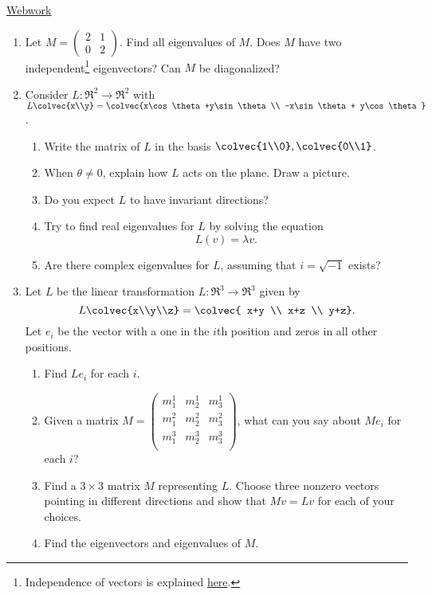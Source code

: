 \href{\webworkurl}{Webwork}


\begin{enumerate}
\item Let $M=\begin{pmatrix}
2 & 1 \\
0 & 2
\end{pmatrix}$.  Find all eigenvalues of $M$.  Does $M$ have two independent\footnote{Independence of vectors is  explained \hyperref[independent]{here}.} eigenvectors?  Can $M$ be diagonalized?


\item Consider $L \colon \Re^2\rightarrow \Re^2$ with $L\colvec{x\\y}
=\colvec{x\cos \theta +y\sin \theta\\ -x\sin \theta + y\cos \theta}$.
\begin{enumerate}
\item Write the matrix of $L$ in the basis $\colvec{1\\0}, \colvec{0\\1}$.

\item When $\theta\neq 0$, explain how $L$ acts on the plane.  Draw a picture.

\item Do you expect $L$ to have invariant directions?

\item Try to find real eigenvalues for $L$ by solving the equation 
\[
L(v)=\lambda v.
\]

\item Are there complex eigenvalues for $L$, assuming that $i=\sqrt{-1}$ exists?
\end{enumerate}


\item Let $L$ be the linear transformation $L \colon \Re^3\rightarrow \Re^3$ given by 
\[L\colvec{x\\y\\z}=\colvec{ x+y \\  x+z \\ y+z}.\]  
Let $e_i$ be the vector with a one in the $i$th position and zeros in all other positions.
\begin{enumerate}
\item Find $Le_i$ for each $i$.
\item Given a matrix $M=\begin{pmatrix}
m^1_1 & m^1_2 & m^1_3\\
m^2_1 & m^2_2 & m^2_3\\
m^3_1 & m^3_2 & m^3_3\\
\end{pmatrix}$, what can you say about $Me_i$ for each $i$?
\item Find a $3\times 3$ matrix $M$ representing $L$.  Choose three nonzero vectors pointing in different directions and show that $Mv=Lv$ for each of your choices.
\item Find the eigenvectors and eigenvalues of \(M.\)


\end{enumerate}
\end{enumerate}
